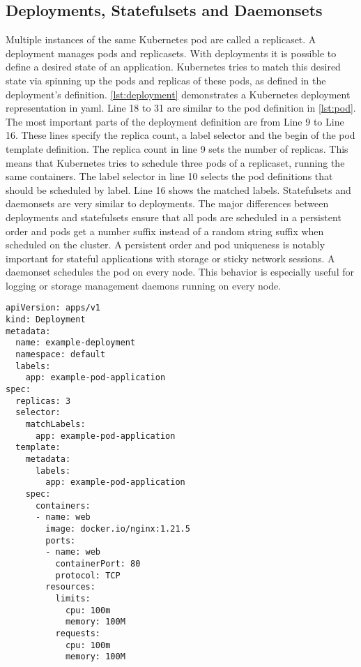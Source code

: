 \documentclass[titlepage]{report}
\begin{document}
\subsection{Deployments, Statefulsets and Daemonsets}
Multiple instances of the same Kubernetes pod are called a replicaset. A deployment manages pods and replicasets. With deployments it is possible to define a desired state of an application. Kubernetes tries to match
this desired state via spinning up the pods and replicas of these pods, as defined in the deployment's definition. \autoref{lst:deployment} demonstrates a Kubernetes deployment representation in \gls{yaml}.
Line 18 to 31 are similar to the pod definition in \autoref{lst:pod}. The most important parts of the deployment definition are from Line 9 to Line 16. These lines specify the replica count, a label selector
and the begin of the pod template definition. The replica count in line 9 sets the number of replicas. This means that Kubernetes tries to schedule three pods of a replicaset, running the same containers.
The label selector in line 10 selects the pod definitions that should be scheduled by label. Line 16 shows the matched labels. Statefulsets and daemonsets are very similar to deployments.
The major differences between deployments and statefulsets ensure that all pods are scheduled in a persistent order and pods get a number suffix instead of a
random string suffix when scheduled on the cluster\cite{KubernetesStatefulset}. A persistent order and pod uniqueness is notably important for stateful applications with storage or sticky network sessions. A daemonset schedules the pod on every node. 
This behavior is especially useful for logging or storage management daemons running on every node\cite{KubernetesDaemonset}. 

\begin{minipage}{\linewidth}
\begin{lstlisting}[caption={An example deployment with three replicas},label={lst:deployment}]
apiVersion: apps/v1
kind: Deployment
metadata:
  name: example-deployment
  namespace: default
  labels:
    app: example-pod-application
spec:
  replicas: 3
  selector:
    matchLabels:
      app: example-pod-application
  template:
    metadata:
      labels:
        app: example-pod-application
    spec:
      containers:
      - name: web
        image: docker.io/nginx:1.21.5
        ports:
        - name: web
          containerPort: 80
          protocol: TCP
        resources:
          limits:
            cpu: 100m
            memory: 100M
          requests:
            cpu: 100m
            memory: 100M
\end{lstlisting}
\end{minipage}
\end{document}
